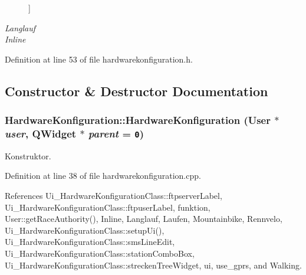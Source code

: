 \begin{Desc}
\begin{description}
{}]\item[{\em 
\hypertarget{class_hardware_konfiguration_f1a8517c9ae8204457ab7ea18fc85f21b39955714b52bd7eac1f2223eee2d5a2}{
Langlauf}
\label{class_hardware_konfiguration_f1a8517c9ae8204457ab7ea18fc85f21b39955714b52bd7eac1f2223eee2d5a2}
}]\item[{\em 
\hypertarget{class_hardware_konfiguration_f1a8517c9ae8204457ab7ea18fc85f21a7312808685728bae5efed47c1e00089}{
Inline}
\label{class_hardware_konfiguration_f1a8517c9ae8204457ab7ea18fc85f21a7312808685728bae5efed47c1e00089}
}]\end{description}
\end{Desc}



Definition at line 53 of file hardwarekonfiguration.h.

\subsection{Constructor \& Destructor Documentation}
\hypertarget{class_hardware_konfiguration_2872e94ce344a468b351bd1e00353760}{
\subsubsection[HardwareKonfiguration]{\setlength{\rightskip}{0pt plus 5cm}HardwareKonfiguration::HardwareKonfiguration ({\bf User} $\ast$ {\em user}, \/  QWidget $\ast$ {\em parent} = {\tt 0})}}
\label{class_hardware_konfiguration_2872e94ce344a468b351bd1e00353760}


Konstruktor. 



Definition at line 38 of file hardwarekonfiguration.cpp.

References Ui\_\-HardwareKonfigurationClass::ftpserverLabel, Ui\_\-HardwareKonfigurationClass::ftpuserLabel, funktion, User::getRaceAuthority(), Inline, Langlauf, Laufen, Mountainbike, Rennvelo, Ui\_\-HardwareKonfigurationClass::setupUi(), Ui\_\-HardwareKonfigurationClass::smsLineEdit, Ui\_\-HardwareKonfigurationClass::stationComboBox, Ui\_\-HardwareKonfigurationClass::streckenTreeWidget, ui, use\_\-gprs, and Walking.

